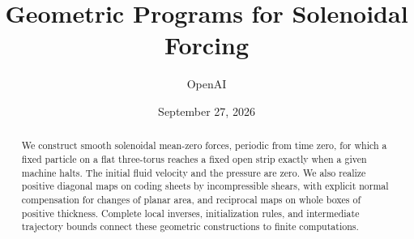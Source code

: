 \documentclass[11pt]{article}
\title{Geometric Programs for Solenoidal Forcing}
\author{OpenAI}
\date{September 27, 2026}
\theoremstyle{remark}
\begin{document}
\maketitle
\begin{abstract}
We construct smooth solenoidal mean-zero forces, periodic from time zero,
for which a fixed particle on a flat three-torus reaches a fixed open strip
exactly when a given machine halts. The initial fluid velocity and the
pressure are zero. We also realize positive diagonal maps on coding sheets
by incompressible shears, with explicit normal compensation for changes
of planar area, and reciprocal maps on whole boxes of positive thickness.
Complete local inverses, initialization rules, and intermediate trajectory
bounds connect these geometric constructions to finite computations.
\end{abstract}



\appendix


\end{document}
